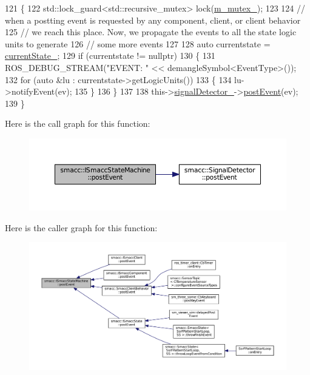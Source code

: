 \begin{DoxyCode}
121 \{
122     std::lock\_guard<std::recursive\_mutex> lock(\hyperlink{classsmacc_1_1ISmaccStateMachine_aac785541646e5c517273bf31072505a1}{m\_mutex\_});
123 
124     \textcolor{comment}{// when a postting event is requested by any component, client, or client behavior}
125     \textcolor{comment}{// we reach this place. Now, we propagate the events to all the state logic units to generate}
126     \textcolor{comment}{// some more events}
127 
128     \textcolor{keyword}{auto} currentstate = \hyperlink{classsmacc_1_1ISmaccStateMachine_a9c6e7745205bcce80a301f2fbe8f7e99}{currentState\_};
129     \textcolor{keywordflow}{if} (currentstate != \textcolor{keyword}{nullptr})
130     \{
131         ROS\_DEBUG\_STREAM(\textcolor{stringliteral}{"EVENT: "} << demangleSymbol<EventType>());
132         \textcolor{keywordflow}{for} (\textcolor{keyword}{auto} &lu : currentstate->getLogicUnits())
133         \{
134             lu->notifyEvent(ev);
135         \}
136     \}
137 
138     this->\hyperlink{classsmacc_1_1ISmaccStateMachine_a3982eb671f5f001cb047d3a467789986}{signalDetector\_}->\hyperlink{classsmacc_1_1SignalDetector_a6ab99d99cef8d101e39797a72daeb2b7}{postEvent}(ev);
139 \}
\end{DoxyCode}


Here is the call graph for this function\+:
\nopagebreak
\begin{figure}[H]
\begin{center}
\leavevmode
\includegraphics[width=350pt]{classsmacc_1_1ISmaccStateMachine_ad80cdd7bbc9a9f3b221c625754fed1ed_cgraph}
\end{center}
\end{figure}




Here is the caller graph for this function\+:
\nopagebreak
\begin{figure}[H]
\begin{center}
\leavevmode
\includegraphics[width=350pt]{classsmacc_1_1ISmaccStateMachine_ad80cdd7bbc9a9f3b221c625754fed1ed_icgraph}
\end{center}
\end{figure}


